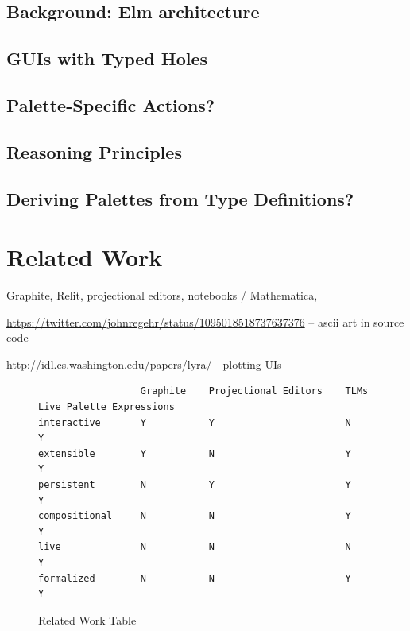 \documentclass[acmsmall,review,anonymous,nonacm]{acmart}
\theoremstyle{slplain}
\numberwithin{thm}{section}
\begin{document}
\subsection{Background: Elm architecture}

\subsection{GUIs with Typed Holes}

\subsection{Palette-Specific Actions?}

\subsection{Reasoning Principles}

\subsection{Deriving Palettes from Type Definitions?}

\clearpage
% 

\clearpage


\clearpage
\section{Related Work}
Graphite, Relit, projectional editors, notebooks / Mathematica, 

\url{https://twitter.com/johnregehr/status/1095018518737637376} -- ascii art in source code

\url{http://idl.cs.washington.edu/papers/lyra/} - plotting UIs

\begin{figure}
\begin{lstlisting}
                  Graphite    Projectional Editors    TLMs     Live Palette Expressions
interactive       Y           Y                       N        Y
extensible        Y           N                       Y        Y
persistent        N           Y                       Y        Y
compositional     N           N                       Y        Y
live              N           N                       N        Y
formalized        N           N                       Y        Y
\end{lstlisting}
\caption{Related Work Table}
\label{fig:related-work}
\end{figure}
\end{document}
